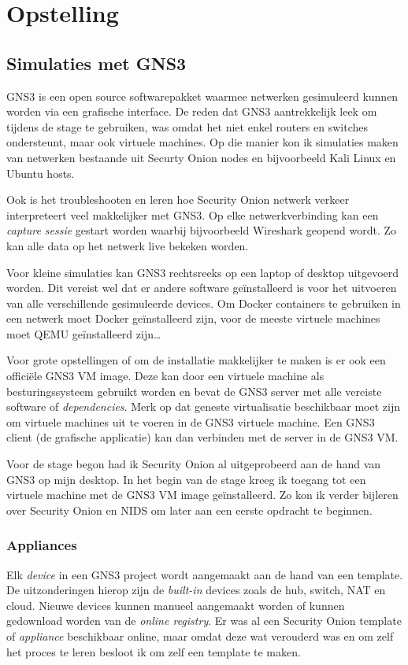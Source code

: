 \documentclass[a4paper,12pt]{report}
\begin{document}
\chapter{Opstelling}
\section{Simulaties met GNS3}
GNS3 is een open source softwarepakket waarmee netwerken gesimuleerd kunnen worden via een grafische interface.
De reden dat GNS3 aantrekkelijk leek om tijdens de stage te gebruiken, was omdat het niet enkel routers en switches ondersteunt, maar ook virtuele machines.
Op die manier kon ik simulaties maken van netwerken bestaande uit Securty Onion nodes en bijvoorbeeld Kali Linux en Ubuntu hosts.

Ook is het troubleshooten en leren hoe Security Onion netwerk verkeer interpreteert veel makkelijker met GNS3.
Op elke netwerkverbinding kan een \emph{capture sessie} gestart worden waarbij bijvoorbeeld Wireshark geopend wordt.
Zo kan alle data op het netwerk live bekeken worden.

Voor kleine simulaties kan GNS3 rechtsreeks op een laptop of desktop uitgevoerd worden.
Dit vereist wel dat er andere software geïnstalleerd is voor het uitvoeren van alle verschillende gesimuleerde devices. 
Om Docker containers te gebruiken in een netwerk moet Docker geïnstalleerd zijn, voor de meeste virtuele machines moet QEMU geïnstalleerd zijn\dots \autocite{gns3:home}

Voor grote opstellingen of om de installatie makkelijker te maken is er ook een officiële GNS3 VM image.
Deze kan door een virtuele machine als besturingssysteem gebruikt worden en bevat de GNS3 server met alle vereiste software of \emph{dependencies}.
Merk op dat geneste virtualisatie beschikbaar moet zijn om virtuele machines uit te voeren in de GNS3 virtuele machine.
Een GNS3 client (de grafische applicatie) kan dan verbinden met de server in de GNS3 VM.

Voor de stage begon had ik Security Onion al uitgeprobeerd aan de hand van GNS3 op mijn desktop.
In het begin van de stage kreeg ik toegang tot een virtuele machine met de GNS3 VM image geïnstalleerd.
Zo kon ik verder bijleren over Security Onion en NIDS om later aan een eerste opdracht te beginnen.

\subsection{Appliances}
Elk \emph{device} in een GNS3 project wordt aangemaakt aan de hand van een template.
De uitzonderingen hierop zijn de \emph{built-in} devices zoals de hub, switch, NAT en cloud.
Nieuwe devices kunnen manueel aangemaakt worden of kunnen gedownload worden van de \emph{online registry}.
Er was al een Security Onion template of \emph{appliance} beschikbaar online, maar omdat deze wat verouderd was en om zelf het proces te leren besloot ik om zelf een template te maken.
\end{document}
